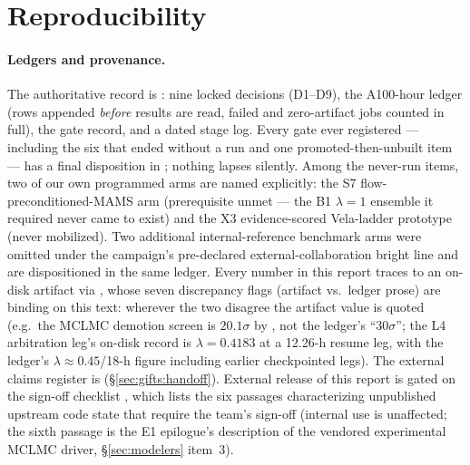 \section{Reproducibility}
\label{sec:repro}

\paragraph{Ledgers and provenance.} The authoritative record is
: nine locked decisions (D1--D9), the A100-hour ledger
(rows appended {\it before} results are read, failed and zero-artifact jobs
counted in full), the gate record, and a dated stage log. Every gate ever
registered --- including the six that ended without a run and one
promoted-then-unbuilt item --- has a final disposition in
; nothing lapses silently. Among
the never-run items, two of our own programmed arms are named
explicitly: the S7 flow-preconditioned-MAMS arm (prerequisite unmet ---
the B1 $\lambda{=}1$ ensemble it required never came to exist) and the
X3 evidence-scored Vela-ladder prototype (never mobilized). Two
additional internal-reference benchmark arms were omitted under the
campaign's pre-declared external-collaboration bright line and are
dispositioned in the same ledger. Every
number in this report traces to an on-disk artifact via
, whose seven discrepancy flags
(artifact vs.\ ledger prose) are binding on this text: wherever the two
disagree the artifact value is quoted (e.g.\ the MCLMC demotion screen is
$20.1\sigma$ by , not the ledger's
``$30\sigma$''; the L4 arbitration leg's on-disk record is
$\lambda=0.4183$ at a 12.26-h resume leg, with the ledger's
$\lambda\approx0.45$/18-h figure including earlier checkpointed legs). The
external claims register is 
(\S\ref{sec:gifts:handoff}). External release of this report is gated on
the sign-off checklist ,
which lists the six passages characterizing unpublished upstream code
state that require the team's sign-off (internal use is unaffected; the
sixth passage is the E1 epilogue's description of the vendored
experimental MCLMC driver, \S\ref{sec:modelers} item~3).

